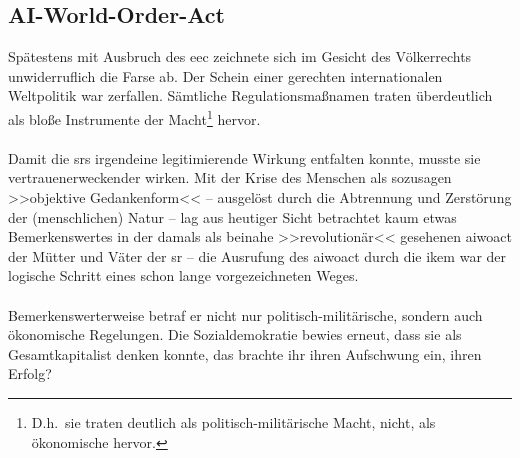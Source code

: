 \subsection{AI-World-Order-Act}
Spätestens mit Ausbruch des \ac{eec} zeichnete sich im Gesicht des Völkerrechts
unwiderruflich die Farse ab. 
Der Schein einer gerechten internationalen Weltpolitik war zerfallen.
Sämtliche Regulationsmaßnamen traten überdeutlich als bloße
Instrumente der Macht\footnote{
  D.h.~sie traten deutlich als politisch-militärische Macht, nicht, als
  ökonomische hervor.
} hervor.\\\\
% 
Damit die \ac{sr}s irgendeine legitimierende Wirkung entfalten konnte,
musste sie vertrauenerweckender wirken. 
Mit der Krise des Menschen als sozusagen >>objektive Gedankenform<< -- ausgelöst
durch die Abtrennung und Zerstörung der (menschlichen) Natur -- lag aus heutiger
Sicht betrachtet kaum etwas Bemerkenswertes in der damals als beinahe
>>revolutionär<< gesehenen \ac{aiwoact} der Mütter und Väter der \ac{sr} -- die
Ausrufung des \ac{aiwoact} durch die \ac{ikem} war der logische Schritt eines schon 
lange vorgezeichneten Weges.\\\\
% 
Bemerkenswerterweise betraf er nicht nur politisch-militärische, sondern auch
ökonomische Regelungen. 
Die Sozialdemokratie bewies erneut, dass sie als Gesamtkapitalist denken konnte,
das brachte ihr ihren Aufschwung ein, ihren Erfolg?
